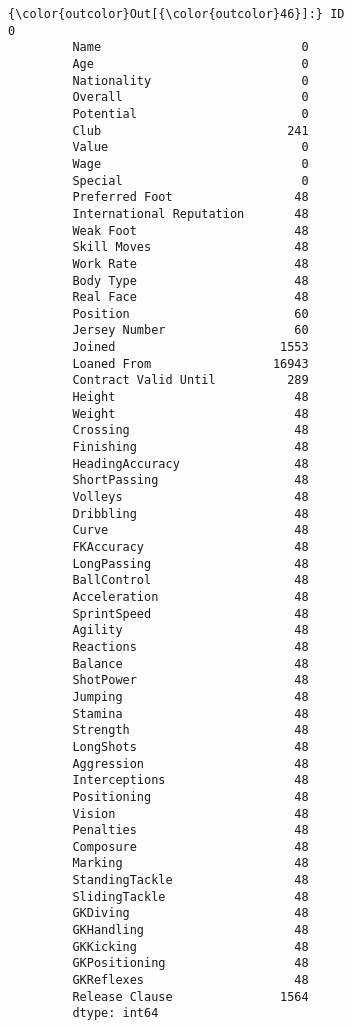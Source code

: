\documentclass[11pt]{article}
\begin{document}
\begin{Verbatim}[commandchars=\\\{\}]
{\color{outcolor}Out[{\color{outcolor}46}]:} ID                              0
         Name                            0
         Age                             0
         Nationality                     0
         Overall                         0
         Potential                       0
         Club                          241
         Value                           0
         Wage                            0
         Special                         0
         Preferred Foot                 48
         International Reputation       48
         Weak Foot                      48
         Skill Moves                    48
         Work Rate                      48
         Body Type                      48
         Real Face                      48
         Position                       60
         Jersey Number                  60
         Joined                       1553
         Loaned From                 16943
         Contract Valid Until          289
         Height                         48
         Weight                         48
         Crossing                       48
         Finishing                      48
         HeadingAccuracy                48
         ShortPassing                   48
         Volleys                        48
         Dribbling                      48
         Curve                          48
         FKAccuracy                     48
         LongPassing                    48
         BallControl                    48
         Acceleration                   48
         SprintSpeed                    48
         Agility                        48
         Reactions                      48
         Balance                        48
         ShotPower                      48
         Jumping                        48
         Stamina                        48
         Strength                       48
         LongShots                      48
         Aggression                     48
         Interceptions                  48
         Positioning                    48
         Vision                         48
         Penalties                      48
         Composure                      48
         Marking                        48
         StandingTackle                 48
         SlidingTackle                  48
         GKDiving                       48
         GKHandling                     48
         GKKicking                      48
         GKPositioning                  48
         GKReflexes                     48
         Release Clause               1564
         dtype: int64
\end{Verbatim}
            
\end{document}
